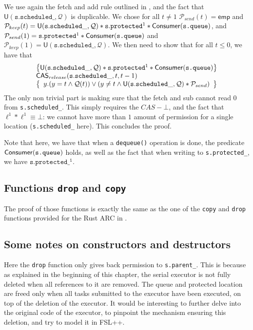 We use again the fetch and add rule outlined in \cite{fsl}, and the fact that $\mathsf{U}(\mathtt{s.scheduled\_}, \mathcal{Q})$ is duplicable. We chose for all $t \neq 1$ $\mathcal{P}_{send}(t) = \mathsf{emp}$ and $\mathcal{P}_{keep}(t) = \mathsf{U}(\mathtt{s.scheduled\_}, \mathcal{Q}) * \mathtt{s.protected}^1 * \mathsf{Consumer}(\texttt{s.queue})$, and $\mathcal{P}_{send}(1) = \mathtt{s.protected}^1 * \mathsf{Consumer}(\texttt{s.queue})$ and $\mathcal{P}_{keep}(1) = \mathsf{U}(\mathtt{s.scheduled\_}, \mathcal{Q})$. We then need to show that for all $t \leq 0$, we have that  
\begin{equation*}
		\begin{array}{l}
		\left\{ \mathsf{U}(\mathtt{s.scheduled\_}, \mathcal{Q}) * \mathtt{s.protected}^1 * \mathsf{Consumer}(\texttt{s.queue})
		\right\}\\
				\mathsf{CAS}_{release}(\mathtt{s.scheduled\_}, t, t - 1) \\
		\left\{
				\begin{array}{l}
						y. (y = t \land \mathcal{Q}(t)) \lor (y \neq t \land \mathsf{U}(\mathtt{s.scheduled\_}, \mathcal{Q}) * \mathcal{P}_{send})
				\end{array}
		\right\}
		\end{array}
\end{equation*}
The only non trivial part is making sure that the fetch and sub cannot read 0 from \texttt{s.scheduled\_}. This simply requires the $CAS-\bot$, and the fact that $\ell^1 * \ell^1 \equiv \bot$: we cannot have more than $1$ amount of permission for a single location (\texttt{s.scheduled\_} here). This concludes the proof.

Note that here, we have that when a \texttt{dequeue()} operation is done, the predicate $\mathsf{Consumer}(\texttt{s.queue})$ holds, as well as the fact that when writing to \texttt{s.protected\_}, we have $\mathtt{s.protected\_^1}$.

\subsection{Functions \texttt{drop} and \texttt{copy}}
The proof of those functions is exactly the same as the one of the \texttt{copy} and \texttt{drop} functions provided for the Rust ARC in \cite{gaurav}.

\subsection{Some notes on constructors and destructors}
Here the \texttt{drop} function only gives back permission to \texttt{s.parent\_}. This is because as explained in the beginning of this chapter, the serial executor is not fully deleted when all references to it are removed. The queue and protected location are freed only when all tasks submitted to the executor have been executed, on top of the deletion of the executor. It would be interesting to further delve into the original code of the executor, to pinpoint the mechanism ensuring this deletion, and try to model it in FSL++.

